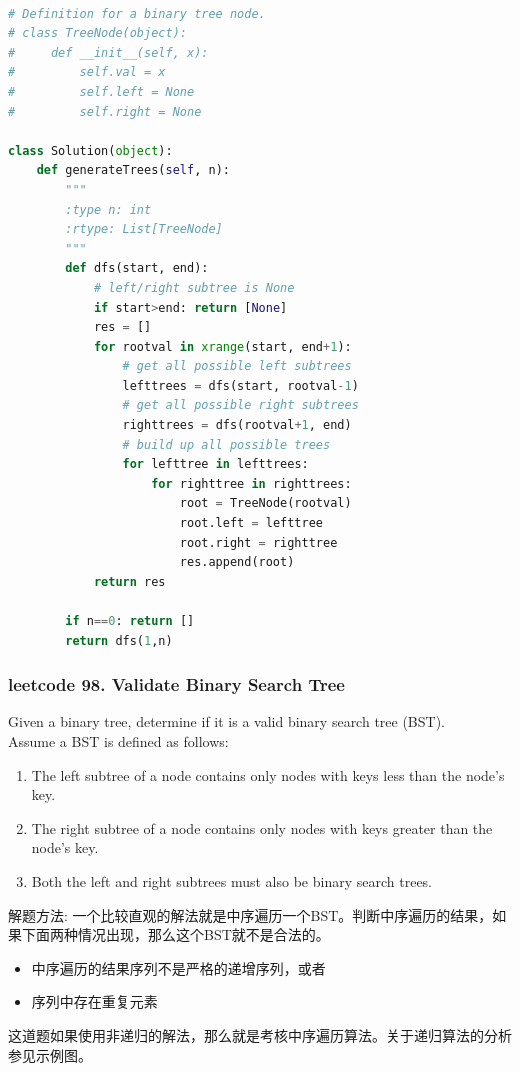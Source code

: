\documentclass[a4paper,10pt]{article}
\begin{document}
\begin{lstlisting}[language=Python, caption=Problem95. Unique Binary Search Trees II]

# Definition for a binary tree node.
# class TreeNode(object):
#     def __init__(self, x):
#         self.val = x
#         self.left = None
#         self.right = None

class Solution(object):
    def generateTrees(self, n):
        """
        :type n: int
        :rtype: List[TreeNode]
        """
        def dfs(start, end):
            # left/right subtree is None
            if start>end: return [None]
            res = []
            for rootval in xrange(start, end+1):
                # get all possible left subtrees
                lefttrees = dfs(start, rootval-1)
                # get all possible right subtrees
                righttrees = dfs(rootval+1, end)
                # build up all possible trees
                for lefttree in lefttrees:
                    for righttree in righttrees:
                        root = TreeNode(rootval)
                        root.left = lefttree
                        root.right = righttree
                        res.append(root)
            return res

        if n==0: return []
        return dfs(1,n)
\end{lstlisting}




\subsubsection{leetcode 98. Validate Binary Search Tree}
Given a binary tree, determine if it is a valid binary search tree (BST).\\

\noindent Assume a BST is defined as follows:
\begin{enumerate}
    \item The left subtree of a node contains only nodes with keys less than the node's key.
    \item The right subtree of a node contains only nodes with keys greater than the node's key.
    \item Both the left and right subtrees must also be binary search trees.
\end{enumerate}

\begin{CJK*}{UTF8}{gbsn}
\noindent 解题方法: 一个比较直观的解法就是中序遍历一个BST。判断中序遍历的结果，如果下面两种情况出现，那么这个BST就不是合法的。
\begin{itemize}
    \item 中序遍历的结果序列不是严格的递增序列，或者
    \item 序列中存在重复元素
\end{itemize}
这道题如果使用非递归的解法，那么就是考核中序遍历算法。关于递归算法的分析参见示例图。
\end{CJK*}
\end{document}
